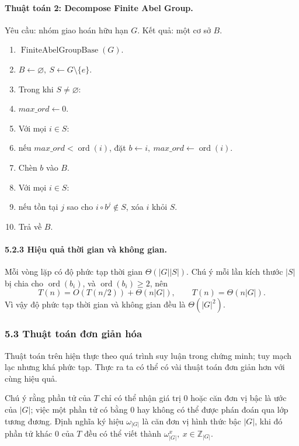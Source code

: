 \documentclass[11pt]{article}
\begin{document}
\paragraph{Thuật toán 2: Decompose Finite Abel Group.}
Yêu cầu: nhóm giao hoán hữu hạn \(G\). Kết quả: một cơ sở \(B\).
\begin{enumerate}[label=\arabic*:,leftmargin=3.2em]
  \item \(\operatorname{FiniteAbelGroupBase}(G)\).
  \item \(B\gets\varnothing,\ S\gets G\setminus\{e\}\).
  \item Trong khi \(S\ne\varnothing\):
  \item \quad \(\textit{max\_ord}\gets0\).
  \item \quad Với mọi \(i\in S\):
  \item \quad\quad nếu \(\textit{max\_ord}<\operatorname{ord}(i)\), đặt
  \(b\gets i,\ \textit{max\_ord}\gets\operatorname{ord}(i)\).
  \item \quad Chèn \(b\) vào \(B\).
  \item \quad Với mọi \(i\in S\):
  \item \quad\quad nếu tồn tại \(j\) sao cho \(i\circ b^j\notin S\), xóa \(i\)
  khỏi \(S\).
  \item Trả về \(B\).
\end{enumerate}

\paragraph{5.2.3 Hiệu quả thời gian và không gian.}
Mỗi vòng lặp có độ phức tạp thời gian \(\Theta(|G||S|)\). Chú ý mỗi lần kích
thước \(|S|\) bị chia cho \(\operatorname{ord}(b_i)\), và
\(\operatorname{ord}(b_i)\ge2\), nên
\[
  T(n)=O(T(n/2))+\Theta(n|G|),\qquad T(n)=\Theta(n|G|).
\]
Vì vậy độ phức tạp thời gian và không gian đều là \(\Theta(|G|^2)\).

\subsubsection*{5.3 Thuật toán đơn giản hóa}

Thuật toán trên hiện thực theo quá trình suy luận trong chứng minh; tuy mạch lạc
nhưng khá phức tạp. Thực ra ta có thể có vài thuật toán đơn giản hơn với cùng
hiệu quả.

Chú ý rằng phần tử của \(T\) chỉ có thể nhận giá trị \(0\) hoặc căn đơn vị bậc
là ước của \(|G|\); việc một phần tử có bằng \(0\) hay không có thể được phán
đoán qua lớp tương đương. Định nghĩa ký hiệu \(\omega_{|G|}\) là căn đơn vị hình
thức bậc \(|G|\), khi đó phần tử khác \(0\) của \(T\) đều có thể viết thành
\(\omega_{|G|}^x,\ x\in\mathbb Z_{|G|}\).
\end{document}
